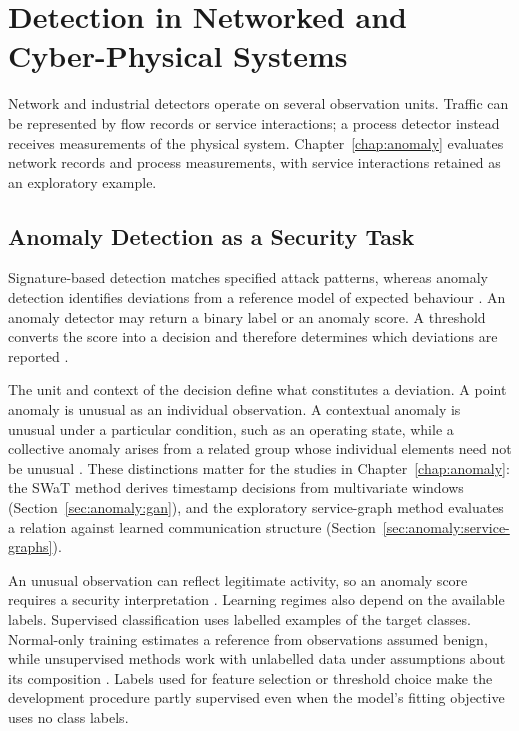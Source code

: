 \section{Detection in Networked and Cyber-Physical Systems}
\label{sec:background:networks}

Network and industrial detectors operate on several observation units. Traffic can be
represented by flow records or service interactions; a process detector instead receives
measurements of the physical system. Chapter~\ref{chap:anomaly} evaluates network records and
process measurements, with service interactions retained as an exploratory example.

\subsection{Anomaly Detection as a Security Task}
\label{sec:background:networks:families}

Signature-based detection matches specified attack patterns, whereas anomaly detection
identifies deviations from a reference model of expected behaviour
\cite{paxson1999bro,chandola2009anomaly}. An anomaly detector may return a binary label or an
anomaly score. A threshold converts the score into a decision and therefore determines which
deviations are reported \cite{chandola2009anomaly}.

The unit and context of the decision define what constitutes a deviation. A point anomaly is
unusual as an individual observation. A contextual anomaly is unusual under a particular
condition, such as an operating state, while a collective anomaly arises from a related group
whose individual elements need not be unusual \cite{chandola2009anomaly}. These distinctions
matter for the studies in Chapter~\ref{chap:anomaly}: the SWaT method derives timestamp decisions from
multivariate windows (Section~\ref{sec:anomaly:gan}), and the exploratory service-graph method evaluates a
relation against learned communication structure
(Section~\ref{sec:anomaly:service-graphs}).

An unusual observation can reflect legitimate activity, so an anomaly score requires a security
interpretation \cite{sommer2010outside}. Learning regimes also depend on the available labels.
Supervised classification uses labelled examples of the target classes. Normal-only training
estimates a reference from observations assumed benign, while unsupervised methods work with
unlabelled data under assumptions about its composition \cite{chandola2009anomaly}. Labels used
for feature selection or threshold choice make the development procedure partly supervised even
when the model's fitting objective uses no class labels.

